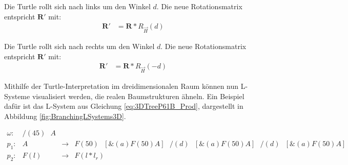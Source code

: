 \begin{description}[labelindent]
	\item[\boldmath$\backslash(d)$]  Die Turtle rollt sich nach links um den Winkel $d$. Die neue Rotationsmatrix entspricht $\boldsymbol{R'}$ mit:\\
	\begin{equation}
	\begin{array}{ll}
	\boldsymbol{R'} & =  \boldsymbol{R} * R_{\overrightarrow{H}}(d)
	\end{array}
	\end{equation}
	
	\item[\boldmath$/(d)$]  Die Turtle rollt sich nach rechts um den Winkel $d$. Die neue Rotationsmatrix entspricht $\boldsymbol{R'}$ mit:\\
	\begin{equation}
	\begin{array}{ll}
	\boldsymbol{R'} & =  \boldsymbol{R} * R_{\overrightarrow{H}}(-d)
	\end{array}
	\end{equation}
\end{description}
\cite[S.19]{ABOP:04} \cite[S.69]{Deussen:05}

Mithilfe der Turtle-Interpretation im dreidimensionalen Raum können nun L-Systeme visualisiert werden, die realen Baumstrukturen ähneln. Ein Beispiel dafür ist das L-System aus Gleichung \ref{eq:3DTreeP61B_Prod}, dargestellt in Abbildung \ref{fig:BranchingLSystems3D}.

\begin{equation}
	\begin{array}{llll}
	\omega :&  /(45)\text{ }A \\
	p_1 :&  A &\rightarrow & F(50)\text{ }[\&(a)F(50)A]\text{ }/(d)\text{ }[\&(a)F(50)A]\text{ }/(d)\text{ }[\&(a)F(50)A] \\
	p_2 :& F(l) &\rightarrow & F(l*l_r)
	\end{array}
	\label{eq:3DTreeP61B_Prod}
\end{equation}

